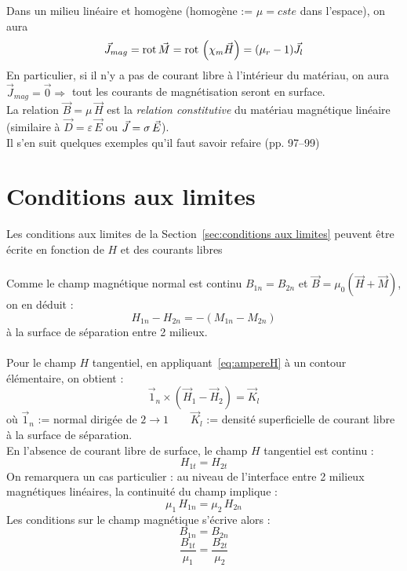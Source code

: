 \documentclass[british,french,11pt, a4paper, openany]{book}
\begin{document}
		Dans un milieu linéaire et homogène (homogène := $\mu=cste$ dans l'espace), on aura 
		\begin{equation}
		\vec J_{mag}=\text{rot}\,\vec M=\text{rot}\,\left(\chi_m\vec H\right)=(\mu_r-1)\vec J_{l}
		\end{equation}
		En particulier, si il n'y a pas de courant libre à l'intérieur du matériau, on aura $\vec J_{mag}=\vec{0}\Rightarrow$ tout les courants de magnétisation seront en surface.\\
		
		La relation $\vec B=\mu\,\vec H$ est la \textit{relation constitutive} du matériau magnétique linéaire (similaire à $\vec D=\varepsilon\,\vec E$ ou $\vec J=\sigma\,\vec E$).\\
		
		Il s'en suit quelques exemples qu'il faut savoir refaire (pp. 97--99)
		\setcounter{section}{4}
		\section{Conditions aux limites}\label{sec:conditions aux limites (magnétisme)}
		Les conditions aux limites de la Section~\ref{sec:conditions aux limites} peuvent être écrite en fonction de $H$ et des courants libres\\\\
		Comme le champ magnétique normal est continu $B_{1n}=B_{2n}$ et $\vec B=\mu_0\left(\vec H+\vec M\right)$, on en déduit :
		\begin{equation}
		H_{1n}-H_{2n}=-(M_{1n}-M_{2n})
		\end{equation}
		à la surface de séparation entre 2 milieux.\\\\
		Pour le champ $H$ tangentiel, en appliquant~\eqref{eq:ampereH} à un contour élémentaire, on obtient : 
		\begin{equation}
		\vec 1_n\times\left(\vec H_1-\vec H_2\right)=\vec K_{l}
		\end{equation}
		où $\vec 1_n$ := normal dirigée de $2\rightarrow 1\qquad\vec K_{l}$ := densité superficielle de courant libre à la surface de séparation.\\
		
		En l'absence de courant libre de surface, le champ $H$ tangentiel est continu : 
		\begin{equation}
		H_{1t}=H_{2t}
		\end{equation}
		On remarquera un cas particulier : au niveau de l'interface entre 2 milieux magnétiques linéaires, la continuité du champ implique :
		\begin{equation}
		\mu_1\, H_{1n}=\mu_2\, H_{2n}
		\end{equation}
		Les conditions sur le champ magnétique s'écrive alors : 
		$$
		B_{1n}=B_{2n}$$ $$
		\frac{B_{1t}}{\mu_1}=\frac{B_{2t}}{\mu_2}
		$$
\end{document}
